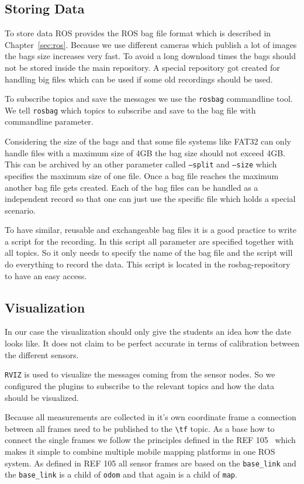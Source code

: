 \subsection{Storing Data}\label{ch:realization:ssec:storingData}

To store data \ac{ROS} provides the ROS bag file format which is described in Chapter~\ref{sec:ros}.
Because we use different cameras which publish a lot of images the bags size increases very fast.
To avoid a long download times the bags should not be stored inside the main repository.
A special repository got created for handling big files which can be used if some old recordings should be used.

To subscribe topics and save the messages we use the \texttt{rosbag} commandline tool.
We tell \texttt{rosbag} which topics to subscribe and save to the bag file with commandline parameter.

Considering the size of the bags and that some file systems like FAT32 can only handle files with a maximum size of 4GB the bag size should not exceed 4GB\@.
This can be archived by an other parameter called \texttt{--split} and \texttt{--size} which specifies the maximum size of one file.
Once a bag file reaches the maximum another bag file gets created.
Each of the bag files can be handled as a independent record so that one can just use the specific file which holds a special scenario.

To have similar, reusable and exchangeable bag files it is a good practice to write a script for the recording.
In this script all parameter are specified together with all topics.
So it only needs to specify the name of the bag file and the script will do everything to record the data.
This script is located in the rosbag-repository to have an easy access.

\subsection{Visualization}\label{ch:realization:ssec:visualization}

In our case the visualization should only give the students an idea how the date looks like.
It does not claim to be perfect accurate in terms of calibration between the different sensors.

\texttt{RVIZ} is used to visualize the messages coming from the sensor nodes.
So we configured the plugins to subscribe to the relevant topics and how the data should be visualized.

Because all measurements are collected in it's own coordinate frame a connection between all frames need to be published to the \texttt{\textbackslash tf} topic.
As a base how to connect the single frames we follow the principles defined in the REF 105~\cite{rosFrames} which makes it simple to combine multiple mobile mapping platforms in one ROS system.
As defined in REF 105 all sensor frames are based on the \texttt{base\_link} and the \texttt{base\_link} is a child of \texttt{odom} and that again is a child of \texttt{map}.

